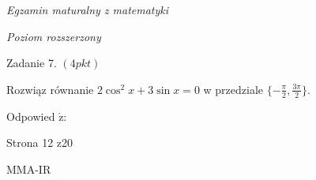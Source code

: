 \documentclass[a4paper,12pt]{article}
\begin{document}
{\it Egzamin maturalny z matematyki}

{\it Poziom rozszerzony}

Zadanie 7. $(4pkt)$

Rozwiąz równanie $2\cos^{2}x+3\sin x=0$ w przedziale $\displaystyle \{-\frac{\pi}{2},\frac{3\pi}{2}\}.$

Odpowied $\acute{\mathrm{z}}$:

Strona 12 z20

MMA-IR
\end{document}
